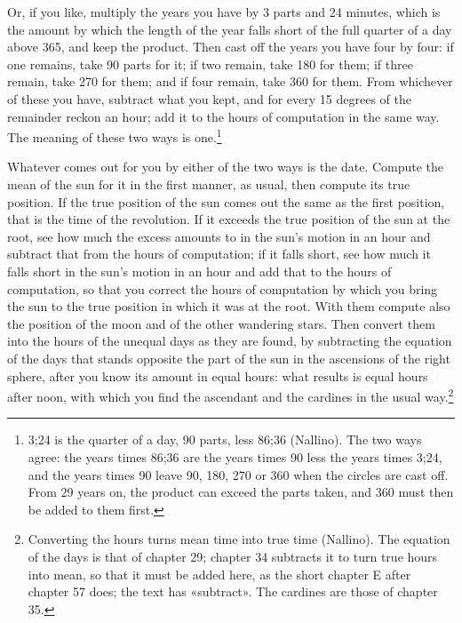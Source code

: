 \documentclass[11pt]{article}
\begin{document}
\par Or, if you like, multiply the years you have by 3 parts and 24 minutes, which is the amount by which the length of the year falls short of the full quarter of a day above 365, and keep the product. Then cast off the years you have four by four: if one remains, take 90 parts for it; if two remain, take 180 for them; if three remain, take 270 for them; and if four remain, take 360 for them. From whichever of these you have, subtract what you kept, and for every 15 degrees of the remainder reckon an hour; add it to the hours of computation in the same way. The meaning of these two ways is one.\footnote{3;24 is the quarter of a day, 90 parts, less 86;36 (Nallino). The two ways agree: the years times 86;36 are the years times 90 less the years times 3;24, and the years times 90 leave 90, 180, 270 or 360 when the circles are cast off. From 29 years on, the product can exceed the parts taken, and 360 must then be added to them first.}\par
\par Whatever comes out for you by either of the two ways is the date. Compute the mean of the sun for it in the first manner, as usual, then compute its true position. If the true position of the sun comes out the same as the first position, that is the time of the revolution. If it exceeds the true position of the sun at the root, see how much the excess amounts to in the sun's motion in an hour and subtract that from the hours of computation; if it falls short, see how much it falls short in the sun's motion in an hour and add that to the hours of computation, so that you correct the hours of computation by which you bring the sun to the true position in which it was at the root. With them compute also the position of the moon and of the other wandering stars. Then convert them into the hours of the unequal days as they are found, by subtracting the equation of the days that stands opposite the part of the sun in the ascensions of the right sphere, after you know its amount in equal hours: what results is equal hours after noon, with which you find the ascendant and the cardines in the usual way.\footnote{Converting the hours turns mean time into true time (Nallino). The equation of the days is that of chapter 29; chapter 34 subtracts it to turn true hours into mean, so that it must be added here, as the short chapter E after chapter 57 does; the text has «subtract». The cardines are those of chapter 35.}\par
\end{document}

